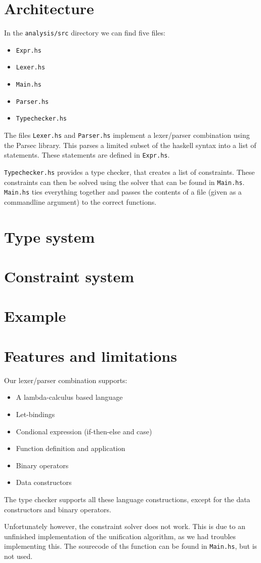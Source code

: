 \documentclass[10pt]{article}
\title{}
\author{Frank Dedden \and Wilco Kusee}
\begin{document}
\maketitle

\section{Architecture}
In the \texttt{analysis/src} directory we can find five files:
\begin{itemize}
	\item \texttt{Expr.hs}
	\item \texttt{Lexer.hs}
	\item \texttt{Main.hs}
	\item \texttt{Parser.hs}
	\item \texttt{Typechecker.hs}
\end{itemize}
The files \texttt{Lexer.hs} and \texttt{Parser.hs} implement a lexer/parser combination using the Parsec library. This parses a limited subset of the haskell syntax into a list of statements. These statements are defined in \texttt{Expr.hs}.

\texttt{Typechecker.hs} provides a type checker, that creates a list of constraints. These constraints can then be solved using the solver that can be found in \texttt{Main.hs}. \texttt{Main.hs} ties everything together and passes the contents of a file (given as a commandline argument) to the correct functions.


\section{Type system}


\section{Constraint system}


\section{Example}


\section{Features and limitations}
Our lexer/parser combination supports:
\begin{itemize}
	\item A lambda-calculus based language
	\item Let-bindings
	\item Condional expression (if-then-else and case)
	\item Function definition and application
	\item Binary operators
	\item Data constructors
\end{itemize}
The type checker supports all these language constructions, except for the data constructors and binary operators.

Unfortunately however, the constraint solver does not work. This is due to an unfinished implementation of the unification algorithm, as we had troubles implementing this. The sourecode of ths function can be found in \texttt{Main.hs}, but is not used.
\end{document}
